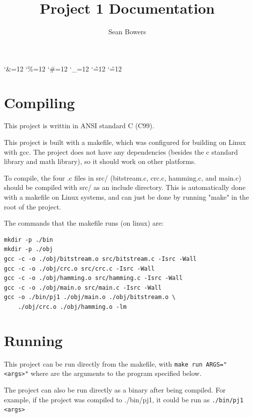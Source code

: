 \documentclass[12pt]{article}
\begin{document}
    \catcode`\&=12
    \catcode`\%=12
    \catcode`\#=12
    \catcode`\_=12
    \catcode`\~=12
    \catcode`\^=12

    \title{Project 1 Documentation}
    \author{Sean Bowers}
    \maketitle

    \section*{Compiling}

    This project is writtin in ANSI standard C (C99).

    This project is built with a makefile, which was configured for building on Linux with gcc.
    The project does not have any dependencies (besides the c standard library and math library), so it should work on other platforms.

    To compile, the four .c files in src/ (bitstream.c, crc.c, hamming.c, and main.c) should be compiled with src/ as an include directory.
    This is automatically done with a makefile on Linux systems, and can just be done by running "make" in the root of the project.

    The commands that the makefile runs (on linux) are:

    \begin{snugshade*}
    \begin{verbatim}
mkdir -p ./bin
mkdir -p ./obj
gcc -c -o ./obj/bitstream.o src/bitstream.c -Isrc -Wall
gcc -c -o ./obj/crc.o src/crc.c -Isrc -Wall
gcc -c -o ./obj/hamming.o src/hamming.c -Isrc -Wall
gcc -c -o ./obj/main.o src/main.c -Isrc -Wall
gcc -o ./bin/pj1 ./obj/main.o ./obj/bitstream.o \
    ./obj/crc.o ./obj/hamming.o -lm
    \end{verbatim}
    \end{snugshade*}

    \section*{Running}

    This project can be run directly from the makefile, with \verb|make run ARGS="<args>"| where are the arguments to the program specified below.

    The project can also be run directly as a binary after being compiled.
    For example, if the project was compiled to ./bin/pj1, it could be run as \verb|./bin/pj1 <args>|
\end{document}

